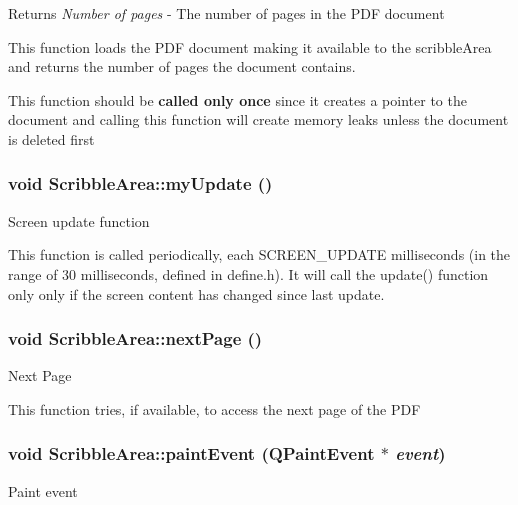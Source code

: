 \begin{DoxyReturn}{Returns}
{\itshape Number of pages\/} -\/ The number of pages in the PDF document
\end{DoxyReturn}
This function loads the PDF document making it available to the scribbleArea and returns the number of pages the document contains.

This function should be {\bfseries called only once} since it creates a pointer to the document and calling this function will create memory leaks unless the document is deleted first \hypertarget{classScribbleArea_ab51bbcc058022cbca00a0edfa724c0d3}{
\subsubsection[{myUpdate}]{\setlength{\rightskip}{0pt plus 5cm}void ScribbleArea::myUpdate ()}}
\label{classScribbleArea_ab51bbcc058022cbca00a0edfa724c0d3}
Screen update function

This function is called periodically, each SCREEN\_\-UPDATE milliseconds (in the range of 30 milliseconds, defined in define.h). It will call the update() function only only if the screen content has changed since last update. \hypertarget{classScribbleArea_a9b44c977dcec2287054f880e410980df}{
\subsubsection[{nextPage}]{\setlength{\rightskip}{0pt plus 5cm}void ScribbleArea::nextPage ()}}
\label{classScribbleArea_a9b44c977dcec2287054f880e410980df}
Next Page

This function tries, if available, to access the next page of the PDF \hypertarget{classScribbleArea_a126a30e3659f6c1cdc202f10fce7e5d9}{
\subsubsection[{paintEvent}]{\setlength{\rightskip}{0pt plus 5cm}void ScribbleArea::paintEvent (QPaintEvent $\ast$ {\em event})}}
\label{classScribbleArea_a126a30e3659f6c1cdc202f10fce7e5d9}
Paint event


